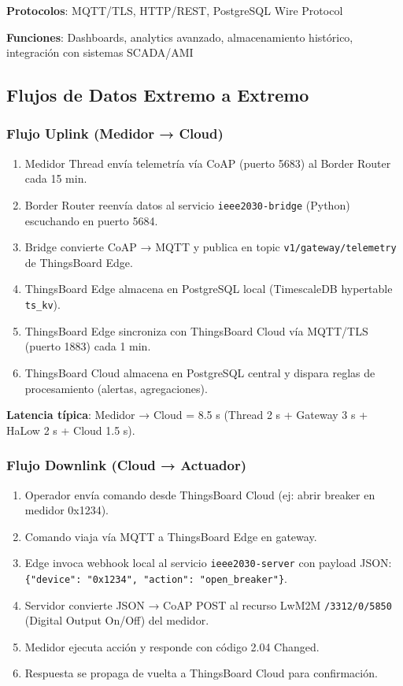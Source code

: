 \textbf{Protocolos}: MQTT/TLS, HTTP/REST, PostgreSQL Wire Protocol

\textbf{Funciones}: Dashboards, analytics avanzado, almacenamiento histórico, integración con sistemas SCADA/AMI

\subsection{Flujos de Datos Extremo a Extremo}

\subsubsection{Flujo Uplink (Medidor → Cloud)}

\begin{enumerate}
    \item Medidor Thread envía telemetría vía CoAP (puerto 5683) al Border Router cada 15 min.
    \item Border Router reenvía datos al servicio \texttt{ieee2030-bridge} (Python) escuchando en puerto 5684.
    \item Bridge convierte CoAP → MQTT y publica en topic \texttt{v1/gateway/telemetry} de ThingsBoard Edge.
    \item ThingsBoard Edge almacena en PostgreSQL local (TimescaleDB hypertable \texttt{ts\_kv}).
    \item ThingsBoard Edge sincroniza con ThingsBoard Cloud vía MQTT/TLS (puerto 1883) cada 1 min.
    \item ThingsBoard Cloud almacena en PostgreSQL central y dispara reglas de procesamiento (alertas, agregaciones).
\end{enumerate}

\textbf{Latencia típica}: Medidor → Cloud = 8.5 s (Thread 2 s + Gateway 3 s + HaLow 2 s + Cloud 1.5 s).

\subsubsection{Flujo Downlink (Cloud → Actuador)}

\begin{enumerate}
    \item Operador envía comando desde ThingsBoard Cloud (ej: abrir breaker en medidor 0x1234).
    \item Comando viaja vía MQTT a ThingsBoard Edge en gateway.
    \item Edge invoca webhook local al servicio \texttt{ieee2030-server} con payload JSON: \texttt{\{"device": "0x1234", "action": "open\_breaker"\}}.
    \item Servidor convierte JSON → CoAP POST al recurso LwM2M \texttt{/3312/0/5850} (Digital Output On/Off) del medidor.
    \item Medidor ejecuta acción y responde con código 2.04 Changed.
    \item Respuesta se propaga de vuelta a ThingsBoard Cloud para confirmación.
\end{enumerate}

